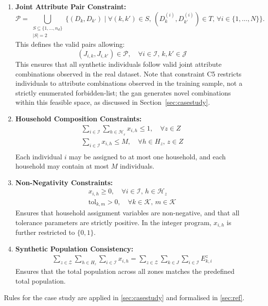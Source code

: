 \begin{enumerate}[label=\textbf{C\arabic*}, ref=C\arabic*]
    \item \textbf{Joint Attribute Pair Constraint:}
\[
\mathcal{P} = \bigcup_{\substack{S \subseteq \{1, \dots, n_d\} \\ |S| = 2}} \{(D_k, D_{k'}) \mid \forall (k, k') \in S, \, (D_k^{(i)}, D_{k'}^{(i)}) \in T, \, \forall i \in \{1, \dots, N\}\}.
\]
This defines the valid pairs allowing:
    \[
    (J_{i,k} ,J_{i,k'}) \in \mathcal{P}, \quad \forall i \in \mathcal{I}, \, k, k' \in \mathcal{J}
    \label{eq:jatt}
    \]
    This ensures that all synthetic individuals follow valid joint attribute combinations observed in the real dataset. Note that constraint C5 restricts individuals to attribute combinations observed in the training sample, not a strictly enumerated forbidden-list; the \gls{gan} generates novel combinations within this feasible space, as discussed in Section~\ref{sec:casestudy}.


    \item \textbf{Household Composition Constraints:}
    \begin{align}
        \sum_{i \in \mathcal{I}}\sum_{h \in \mathcal{H_z}} x_{i,h} \leq 1, \quad \forall z \in Z\\
         \sum_{i \in \mathcal{I}} x_{i,h} \leq M, \quad \forall h \in H_z, \, z \in Z\\
        \label{eq:household_composition}
    \end{align}
   Each individual $i$ may be assigned to at most one household, and each household may contain at most $M$ individuals.

    \item \textbf{Non-Negativity Constraints:} %
    \begin{align}
        x_{i,h} \geq 0, \quad \forall i \in \mathcal{I}, \, h \in \mathcal{H}_z \\
        \text{tol}_{k,m} > 0, \quad \forall k \in \mathcal{K}, \, m \in \mathcal{K}
        \label{eq:nonneg_constraints}
    \end{align}
    Ensures that household assignment variables are non-negative, and that all tolerance parameters are strictly positive. In the integer program, $x_{i,h}$ is further restricted to $\{0,1\}$.

    \item \textbf{Synthetic Population Consistency:}
    \begin{align}
        \sum_{z \in \mathcal{Z}} \sum_{h \in H_z} \sum_{i \in \mathcal{I}} x_{i,h} =  \sum_{z \in \mathcal{Z}} \sum_{k \in J} \sum_{i \in \mathcal{I}}E^z_{k,i}
        \label{eq:population_consistency}
    \end{align}
    Ensures that the total population across all zones matches the predefined total population.


\end{enumerate}
Rules for the case study are applied in \cref{sec:casestudy} and formalised in \cref{sec:ref}.
